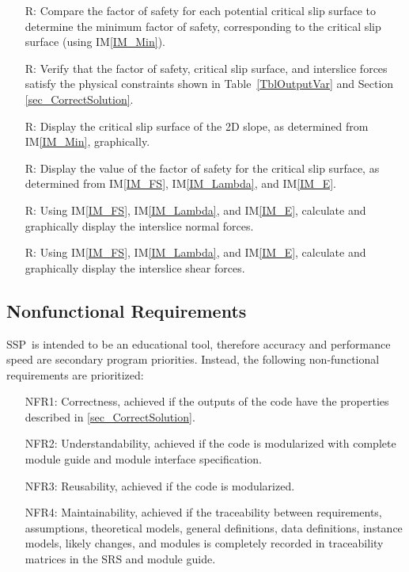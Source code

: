 \documentclass[12pt]{article}
\newcommand{\progname}{SSP}
\newcommand{\iref}[1]{IM\ref{#1}}
\newcounter{reqnum} %
\begin{document}
\begin{itemize}
\item[R\refstepcounter{reqnum}\thereqnum \label{R_Minimize}:] Compare the 
factor of safety for each potential critical slip surface to determine the 
minimum factor of safety, corresponding to the critical slip surface (using 
\iref{IM_Min}).

\item[R\refstepcounter{reqnum}\thereqnum \label{R_VerifyOutput}:] Verify that 
the factor of safety, critical slip surface, and interslice forces satisfy the 
physical constraints shown in Table~\ref{TblOutputVar} and Section
\ref{sec_CorrectSolution}.

\item[R\refstepcounter{reqnum}\thereqnum \label{R_CritGraph}:] Display
  the critical slip surface of the 2D slope, as determined from \iref{IM_Min}, 
  graphically. 
  
\item[R\refstepcounter{reqnum}\thereqnum \label{R_OutputFS}:] Display the value 
of the factor of safety for the critical slip surface, as determined from 
\iref{IM_FS}, \iref{IM_Lambda}, and \iref{IM_E}.

\item[R\refstepcounter{reqnum}\thereqnum \label{R_NormalGraph}:] Using 
\iref{IM_FS}, \iref{IM_Lambda}, and \iref{IM_E}, calculate and 
graphically display the interslice normal forces.

\item[R\refstepcounter{reqnum}\thereqnum \label{R_ShearGraph}:] Using 
\iref{IM_FS}, \iref{IM_Lambda}, and \iref{IM_E}, calculate and 
graphically display the interslice shear forces.
  
\end{itemize}


\subsection{Nonfunctional Requirements}

\progname\ is intended to be an educational tool, therefore accuracy and
performance speed are secondary program priorities. Instead, the following 
non-functional requirements are prioritized:

\begin{itemize}
\item[NFR1:] Correctness, achieved if the outputs of the code have the 
properties described 
in \ref{sec_CorrectSolution}.
\item[NFR2:] Understandability, achieved if the code is modularized with 
complete module guide and module interface specification.
\item[NFR3:] Reusability, achieved if the code is modularized.
\item[NFR4:] Maintainability, achieved if the traceability between 
requirements, assumptions, theoretical models, general definitions, data 
definitions, instance models, likely changes, and modules is completely 
recorded in traceability matrices in the SRS and module guide.
\end{itemize}
\end{document}
